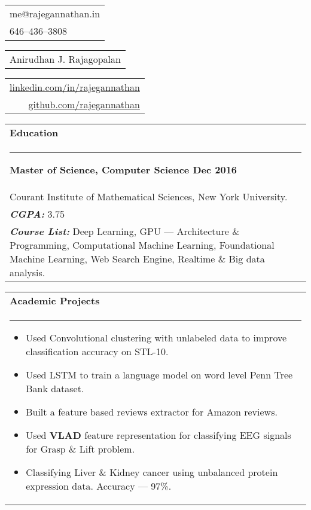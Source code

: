\documentclass{article}
\begin{document}
{\small\begin{tabular}[c]{l}
        me@rajegannathan.in \\
        646--436--3808
\end{tabular}}\hfill%
{\Large\bfseries\begin{tabular}[c]{c}
        Anirudhan J. Rajagopalan
\end{tabular}}\hfill%
{\small\begin{tabular}[c]{r}
        \href{https://linkedin.com/in/rajegannathan}{linkedin.com/in/rajegannathan} \\
        \href{https://github.com/rajegannathan}{github.com/rajegannathan}
\end{tabular}}%


\bigskip

\begin{tabular}{p{\dimexpr\linewidth-2\tabcolsep}}
    \textbf{\large{Education}} \\
    \noindent\rule{\textwidth}{0.4pt}
    {\bfseries Master of Science, Computer Science \hfill Dec 2016} \\
    \quad Courant Institute of Mathematical Sciences, New York University.\\
    \quad \textbf{\textit{CGPA:}} 3.75 \\
    \quad \textbf{\textit{Course List:}} Deep Learning, GPU --- Architecture \& Programming, Computational Machine Learning, Foundational Machine Learning, Web Search Engine, Realtime \& Big data analysis.
\end{tabular}

\bigskip

\begin{tabular}{p{\dimexpr\linewidth-2\tabcolsep}}
    \textbf{\large{Academic Projects}} \\
    \noindent\rule{\textwidth}{0.4pt}

    \begin{itemize}
        \item Used Convolutional clustering with unlabeled data to improve classification accuracy on STL-10.
        \item Used LSTM to train a language model on word level Penn Tree Bank dataset.
        \item Built a feature based reviews extractor for Amazon reviews.
        \item Used \textbf{VLAD} feature representation for classifying EEG signals for Grasp \& Lift problem.
        \item Classifying Liver \& Kidney cancer using unbalanced protein expression data. Accuracy --- 97\%.
    \end{itemize}
\end{tabular}
\end{document}
